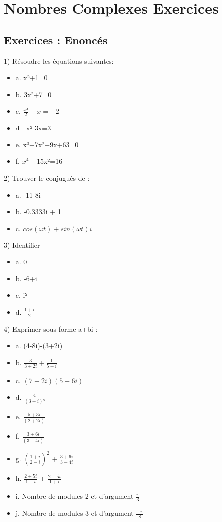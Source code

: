 \newpage

\section{Nombres Complexes Exercices}
\vspace{5mm} %
\subsection{Exercices : Enoncés}

\vspace{5mm} %
1) Résoudre les équations suivantes:

\begin{itemize}
\item {a. x²+1=0}
\item {b. 3x²+7=0}
\item {c. $\frac{x²}{2} -x=-2$}
\item {d. -x²-3x=3}
\item {e. x³+7x²+9x+63=0}
\item {f. $x^{4}$ +15x²=16}
\end{itemize}

\vspace{3mm} %
2) Trouver le conjugués de :

\begin{itemize}
\item {a. -11-8i}
\item {b. -0.3333i + 1}
\item {c. $cos(\omega t) + sin(\omega t)i$}
\end{itemize}

\vspace{3mm} %
3) Identifier \R $  $ \I

\begin{itemize}
\item {a. 0}
\item {b. -6+i}
\item {c. i²}
\item {d. $\frac{1+i}{2}$}
\end{itemize}


\vspace{3mm} %
4) Exprimer sous forme a+bi :

\begin{itemize}
\item {a. (4-8i)-(3+2i)}
\item {b. $\frac{3}{3+2i} + \frac{1}{5-i}$}
\item {c. $(7-2i)(5+6i)$}
\item {d. $\frac{4}{(3+i)³}$}
\item {e. $\frac{5+3i}{(2+2i)} $}
\item {f. $\frac{3+6i}{(3-4i)} $}
\item {g. $(\frac{1+i}{2-i})^{2}$ + $\frac{3+6i}{3-4i}$}
\item {h. $\frac{2+5i}{1-i}$ + $\frac{2-5i}{1+i}$}
\item {i. Nombre de modules 2 et d'argument $\frac{\pi}{3}$}
\item {j. Nombre de modules 3 et d'argument $\frac{-\pi}{8}$}
\end{itemize}

